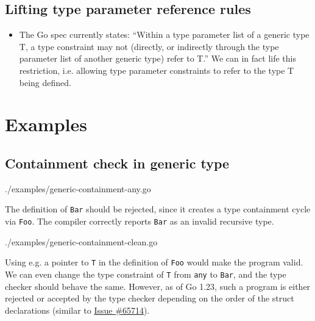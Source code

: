 \documentclass[12pt]{article}
\begin{document}

\subsection{Lifting type parameter reference rules}

\begin{itemize}
    \item The Go spec currently states: ``Within a type parameter list of a
          generic type T, a type constraint may not (directly, or indirectly
          through the type parameter list of another generic type) refer to T.''
          We can in fact life this restriction, i.e. allowing type parameter
          constraints to refer to the type T being defined.
\end{itemize}

\section{Examples}

\subsection{Containment check in generic type}

\noindent\begin{minipage}[t]{.45\linewidth}
    
    {./examples/generic-containment-any.go}

    The definition of \texttt{Bar} should be rejected, since it creates a type
    containment cycle via \texttt{Foo}. The compiler correctly reports \texttt{Bar}
    as an invalid recursive type.
\end{minipage}
\hfill
\noindent\begin{minipage}[t]{.45\linewidth}
    
    {./examples/generic-containment-clean.go}

    Using e.g. a pointer to \texttt{T} in the
    definition of \texttt{Foo} would make the program valid. We can even
    change the type constraint of \texttt{T} from \texttt{any} to \texttt{Bar}, and
    the type checker should behave the same. However, as of Go 1.23, such a program
    is either rejected or accepted by the type checker depending on the order of the
    struct declarations (similar to \href{https://github.com/golang/go/issues/65714}{Issue
        \#65714}).

\end{minipage}
\end{document}
